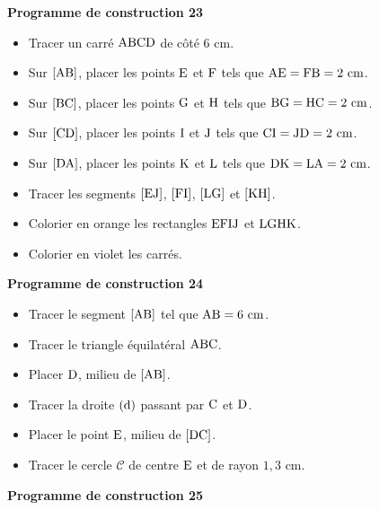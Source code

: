 \documentclass{article}
\begin{document}
\noindent\textbf{Programme de construction 23}\par\smallskip\noindent
\begin{itemize}
    \item Tracer un carré $\text{ABCD}$ de côté $6\text{ cm}$.
    \item Sur $[\text{AB}]$, placer les points $\text{E}$ et
    $\text{F}$ tels que $\text{AE}=\text{FB}=2\text{ cm}$.
    \item Sur $[\text{BC}]$, placer les points $\text{G}$ et
    $\text{H}$ tels que $\text{BG}=\text{HC}=2\text{ cm}$.
    \item Sur $[\text{CD}]$, placer les points $\text{I}$ et
    $\text{J}$ tels que $\text{CI}=\text{JD}=2\text{ cm}$.
    \item Sur $[\text{DA}]$, placer les points $\text{K}$ et
    $\text{L}$ tels que $\text{DK}=\text{LA}=2\text{ cm}$.
    \item Tracer les segments $[\text{EJ}]$, $[\text{FI}]$,
    $[\text{LG}]$ et $[\text{KH}]$.
    \item Colorier en orange les rectangles $\text{EFIJ}$ et
    $\text{LGHK}$.
    \item Colorier en violet les carrés.
\end{itemize}
\noindent\textbf{Programme de construction 24}\par\smallskip\noindent
\begin{itemize}
    \item Tracer le segment $[\text{AB}]$ tel que
    $\text{AB}=6\text{ cm}$.
    \item Tracer le triangle équilatéral $\text{ABC}$.
    \item Placer $\text{D}$, milieu de $[\text{AB}]$.
    \item Tracer la droite $(\text{d})$ passant par
    $\text{C}$ et $\text{D}$.
    \item Placer le point $\text{E}$, milieu de $[\text{DC}]$.
    \item Tracer le cercle $\mathcal{C}$ de centre $\text{E}$ et de
    rayon $1{,}3\text{ cm}$.
\end{itemize}
\noindent\textbf{Programme de construction 25}\par\smallskip\noindent
\end{document}
